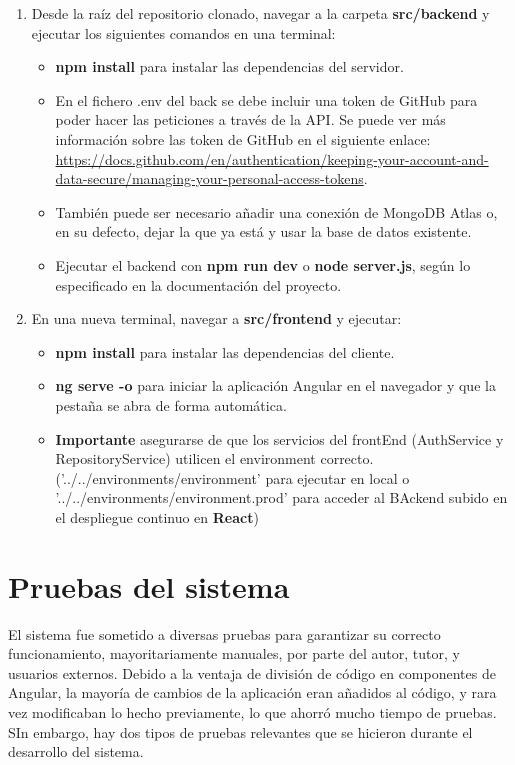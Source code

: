 \begin{enumerate}

	\item Desde la raíz del repositorio clonado, navegar a la carpeta \textbf{src/backend} y ejecutar los siguientes comandos en una terminal:
	\begin{itemize}
		\item \textbf{npm install} para instalar las dependencias del servidor.
		\item En el fichero .env del back se debe incluir una token de GitHub para poder hacer las peticiones a través de la API. Se puede ver más información sobre las token de GitHub en el siguiente enlace: \url{https://docs.github.com/en/authentication/keeping-your-account-and-data-secure/managing-your-personal-access-tokens}. 
        \item También puede ser necesario añadir una conexión de MongoDB Atlas o, en su defecto, dejar la que ya está y usar la base de datos existente.
		\item Ejecutar el backend con \textbf{npm run dev} o \textbf{node server.js}, según lo especificado en la documentación del proyecto.
	\end{itemize}

	\item En una nueva terminal, navegar a \textbf{src/frontend} y ejecutar:
	\begin{itemize}
		\item \textbf{npm install} para instalar las dependencias del cliente.
		\item \textbf{ng serve -o} para iniciar la aplicación Angular en el navegador y que la pestaña se abra de forma automática.
        \item \textbf{Importante} asegurarse de que los servicios del frontEnd (AuthService y RepositoryService) utilicen el environment correcto. ('../../environments/environment' para ejecutar en local o '../../environments/environment.prod' para acceder al BAckend subido en el despliegue continuo en \textbf{React})
	\end{itemize}
\end{enumerate}

\section{Pruebas del sistema}

El sistema fue sometido a diversas pruebas para garantizar su correcto funcionamiento, mayoritariamente manuales, por parte del autor, tutor, y usuarios externos. Debido a la ventaja de división de código en componentes de Angular, la mayoría de cambios de la aplicación eran añadidos al código, y rara vez modificaban lo hecho previamente, lo que ahorró mucho tiempo de pruebas. SIn embargo, hay dos tipos de pruebas relevantes que se hicieron durante el desarrollo del sistema.

